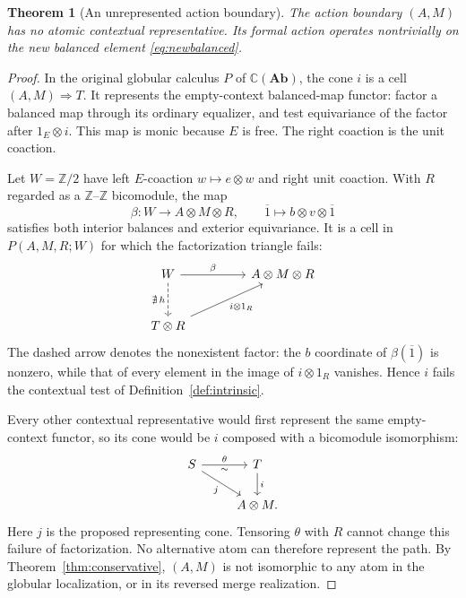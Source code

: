 \documentclass[11pt,a4paper]{article}
\newtheorem{theorem}{Theorem}[section]
\theoremstyle{definition}
\theoremstyle{remark}
\numberwithin{equation}{section}
\newcommand{\Ccal}{\mathbb C}
\newcommand{\Z}{\mathbb Z}
\newcommand{\Ab}{\mathbf{Ab}}
\newcommand{\cell}{\mathrel{\Longrightarrow}}
\begin{document}
\begin{theorem}[An unrepresented action boundary]\label{thm:strong}\label{prop:strong}
The action boundary $(A,M)$ has no atomic contextual representative.
Its formal action operates nontrivially on the new balanced element
\eqref{eq:newbalanced}.
\end{theorem}
\begin{proof}
In the original globular calculus $P$ of $\Ccal(\Ab)$, the cone $i$
is a cell $(A,M)\cell T$. It represents the empty-context balanced-map
functor: factor a balanced map through its ordinary equalizer, and
test equivariance of the factor after $1_E\otimes i$. This map is
monic because $E$ is free. The right coaction is the unit coaction.

Let $W=\Z/2$ have left $E$-coaction $w\mapsto e\otimes w$ and right
unit coaction. With $R$ regarded as a $\Z$--$\Z$ bicomodule, the map
\[
\beta:W\longrightarrow A\otimes M\otimes R,\qquad
\overline1\longmapsto b\otimes v\otimes\overline1
\]
satisfies both interior balances and exterior equivariance. It is a
cell in $P(A,M,R;W)$ for which the factorization triangle fails:
\[
\begin{tikzcd}[column sep=4.4em,row sep=2.6em]
W \arrow[r,"\beta"] \arrow[d,dashed,"\nexists\,h"'] &
A\otimes M\otimes R\\
T\otimes R \arrow[ur,"i\otimes1_R"'] &
\end{tikzcd}
\]
The dashed arrow denotes the nonexistent factor: the $b$ coordinate
of $\beta(\overline1)$ is nonzero, while that of every element in the
image of $i\otimes1_R$ vanishes.
Hence $i$ fails the contextual test of Definition~\ref{def:intrinsic}.

Every other contextual representative would first represent the same
empty-context functor, so its cone would be $i$ composed with a
bicomodule isomorphism:
\[
\begin{tikzcd}
S \arrow[r,"\theta","\sim"'] \arrow[dr,"j"'] &
T \arrow[d,"i"]\\
& A\otimes M.
\end{tikzcd}
\]
Here $j$ is the proposed representing cone. Tensoring $\theta$ with $R$ cannot
change this failure of factorization. No alternative atom can therefore
represent the path. By Theorem~\ref{thm:conservative}, $(A,M)$ is not
isomorphic to any atom in the globular localization, or in its reversed
merge realization.


\end{proof}
\end{document}
